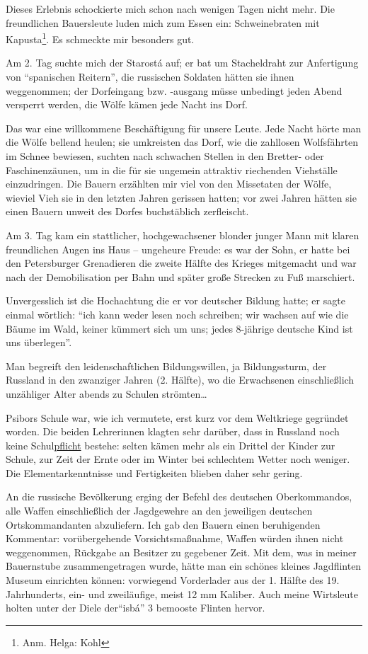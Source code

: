 \documentclass[a5paper,pagesize,10pt,twoside=true]{scrbook}
\renewcommand{\marginpar}[2][]{}
\begin{document}
Dieses Erlebnis schockierte mich schon nach wenigen Tagen nicht mehr. Die freundlichen Bauersleute luden mich zum Essen ein: Schweinebraten mit Kapusta\footnote{Anm. Helga: Kohl}. Es schmeckte mir besonders gut.

Am 2. Tag suchte mich der Starostá auf; er bat um Stacheldraht zur Anfertigung von \enquote{spanischen Reitern}, die russischen Soldaten hätten sie ihnen weggenommen; der Dorfeingang bzw. -ausgang müsse unbedingt jeden Abend versperrt werden, die Wölfe kämen jede Nacht ins Dorf.

Das war eine willkommene Beschäftigung für unsere Leute. Jede Nacht hörte man die Wölfe bellend heulen; sie umkreisten das Dorf, wie die zahllosen Wolfsfährten im Schnee bewiesen, suchten nach schwachen Stellen in den Bretter- oder Faschinenzäunen, um in die für sie ungemein attraktiv riechenden Viehställe einzudringen. Die Bauern erzählten mir viel von den Missetaten der Wölfe, wieviel Vieh sie in den letzten Jahren gerissen hatten; vor zwei Jahren hätten sie einen Bauern unweit des Dorfes buchstäblich zerfleischt.

\marginpar{346}
Am 3. Tag kam ein stattlicher, hochgewachsener blonder junger Mann mit klaren freundlichen Augen ins Haus -- ungeheure Freude: es war der Sohn, er hatte bei den Petersburger Grenadieren die zweite Hälfte des Krieges mitgemacht und war nach der Demobilisation per Bahn und später große Strecken zu Fuß marschiert.

Unvergesslich ist die Hochachtung die er vor deutscher Bildung hatte; er sagte einmal wörtlich: \enquote{ich kann weder lesen noch schreiben; wir wachsen auf wie die Bäume im Wald, keiner kümmert sich um uns; jedes 8-jährige deutsche Kind ist uns überlegen}.

Man begreift den leidenschaftlichen Bildungswillen, ja Bildungssturm, der Russland in den zwanziger Jahren (2. Hälfte), wo die Erwachsenen einschließlich unzähliger Alter abends zu Schulen strömten\dots

Psibors Schule war, wie ich vermutete, erst kurz vor dem Weltkriege gegründet worden. Die beiden Lehrerinnen klagten sehr darüber, dass in Russland noch keine Schul\underline{pflicht} bestehe: selten kämen mehr als ein Drittel der Kinder zur Schule, zur Zeit der Ernte oder im Winter bei schlechtem Wetter noch weniger. Die Elementarkenntnisse und Fertigkeiten blieben daher sehr gering.

An die russische Bevölkerung erging der Befehl des deutschen Oberkommandos, alle Waffen einschließlich der Jagdgewehre an den jeweiligen deutschen Ortskommandanten abzuliefern. Ich gab den Bauern einen beruhigenden Kommentar: vorübergehende Vorsichtsmaßnahme, Waffen würden ihnen nicht weggenommen, Rückgabe an Besitzer zu gegebener Zeit. Mit dem, was in meiner Bauernstube zusammengetragen wurde, hätte man ein schönes kleines Jagdflinten Museum einrichten können: vorwiegend Vorderlader aus der 1. Hälfte des 19. Jahrhunderts, ein- und zweiläufige, meist 12 mm Kaliber. Auch meine Wirtsleute holten unter der Diele der\enquote{isbá} 3 bemooste Flinten hervor.
\end{document}
